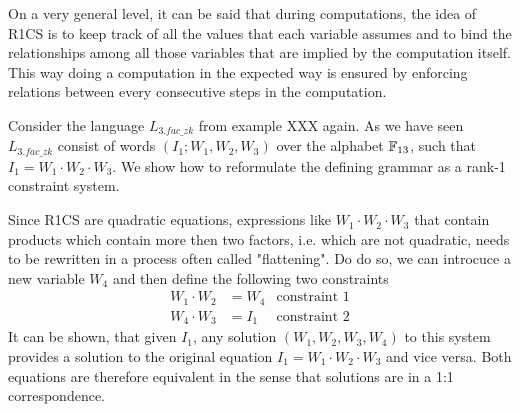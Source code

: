 On a very general level, it can be said that during computations, the idea of R1CS is to keep track of all the values that each variable assumes and to bind the relationships among all those variables that are implied by the computation itself. This way doing a computation in the expected way is ensured by enforcing relations between every consecutive steps in the computation.
\begin{example}[3-Factorization]Consider the language $L_{3.fac\_zk}$ from example XXX again. As we have seen $L_{3.fac\_zk}$ consist of words $(I_1;W_1,W_2,W_3)$ over the alphabet $\mathbb{F}_{13}$, such that $I_1 = W_1\cdot W_2\cdot W_3$. We show how to reformulate the defining grammar as a rank-1 constraint system.

Since R1CS are quadratic equations, expressions like $W_1\cdot W_2\cdot W_3$ that contain products which contain more then two factors, i.e. which are not quadratic, needs to be rewritten in a process often called "flattening". Do do so, we can introcuce a new variable $W_4$ and then define the following two constraints
\begin{align*}
W_1 \cdot W_2 & = W_4 & \text{constraint } 1\\
W_4 \cdot W_3 & = I_1 & \text{constraint } 2
\end{align*}
It can be shown, that given $I_1$, any solution $(W_1,W_2,W_3,W_4)$ to this system provides a solution to the original equation $I_1 = W_1\cdot W_2\cdot W_3$ and vice versa. Both equations are therefore equivalent in the sense that solutions are in a 1:1 correspondence.


\end{example}

